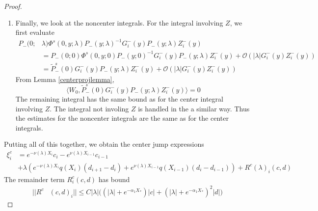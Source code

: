 \documentclass[thesis.tex]{subfiles}
\begin{document}
\begin{lemma}
\begin{proof}
\begin{enumerate}
\item Finally, we look at the noncenter integrals. For the integral involving $Z$, we first evaluate 
\begin{align*}
P_-(0; &\lambda) \Phi^s(0, y; \lambda) P_-(y; \lambda)^{-1} G_i^-(y) P_-(y; \lambda)Z_i^-(y) \\
&= P_-(0; 0) \Phi^s(0, y; 0) P_-(y; 0)^{-1}G_i^-(y) P_-(y; \lambda)Z_i^-(y) + \mathcal{O}(|\lambda| G_i^-(y) Z_i^-(y)) \\
&= \tilde{P}_-^s(0)G_i^-(y) P_-(y; \lambda)Z_i^-(y) + \mathcal{O}(|\lambda| G_i^-(y) Z_i^-(y))
\end{align*}
From Lemma \ref{centerprojlemma},
\[
\langle W_0, \tilde{P}_-^s(0)G_i^-(y) P_-(y; \lambda)Z_i^-(y) \rangle = 0
\]
The remaining integral has the same bound as for the center integral involving $Z$. The integral not involing $Z$ is handled in the a similar way. Thus the estimates for the noncenter integrals are the same as for the center integrals.
\end{enumerate}

Putting all of this together, we obtain the center jump expressions
\begin{align*}
\xi^c_i &= e^{-\nu(\lambda) X_i} c_i - e^{\nu(\lambda) X_{i-1}} c_{i-1} \\
&+ \lambda \left( e^{-\nu(\lambda)X_i} q(X_i) (d_{i+1} - d_i ) + e^{\nu(\lambda)X_{i-1}} q(X_{i-1}) (d_i - d_{i-1} )\right) + R^c(\lambda)_i(c, d)
\end{align*}
The remainder term $R^c_i(c, d)$ has bound
\begin{equation}\label{centerR}
\begin{aligned}
||R^c&(c, d)_i|| \leq C |\lambda| \Big( (|\lambda| + e^{-\alpha_1 X_*})|c| + (|\lambda| + e^{-\alpha_1 X_*})^2 |d| \Big)
\end{aligned}
\end{equation}


\end{proof}
\end{lemma}
\end{document}
